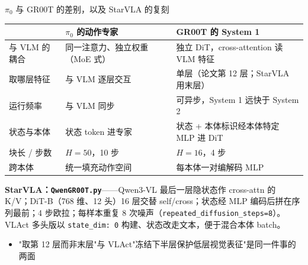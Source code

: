 \documentclass[aspectratio=169,10pt]{beamer}
\begin{document}
\begin{frame}{$\pi_0$ 与 GR00T 的差别，以及 StarVLA 的复刻}
  \begin{center}\small
  \begin{tabular}{p{2.6cm}p{4.6cm}p{5.4cm}}
    \toprule
     & $\pi_0$ 的动作专家 & GR00T 的 System 1 \\
    \midrule
    与 VLM 的耦合 & 同一注意力、独立权重（MoE 式） & 独立 DiT，cross-attention 读 VLM 特征 \\
    取哪层特征 & 与 VLM 逐层交互 & 单层（论文第 12 层；StarVLA 用末层） \\
    运行频率 & 与 VLM 同步 & 可异步，System 1 远快于 System 2 \\
    状态与本体 & 状态 token 进专家 & 状态 + 本体标识经本体特定 MLP 进 DiT \\
    块长 / 步数 & $H=50$，10 步 & $H=16$，4 步 \\
    跨本体 & 统一填充动作空间 & 每本体一对编解码 MLP \\
    \bottomrule
  \end{tabular}
  \end{center}
  \vspace{4pt}
  \textbf{StarVLA：\texttt{QwenGR00T.py}}——Qwen3-VL 最后一层隐状态作 cross-attn 的 K/V；DiT-B（768 维、12 头）16 层交替 self/cross；状态经 MLP 编码后拼在序列最前；4 步欧拉；每样本重复 8 次噪声（\texttt{repeated\_diffusion\_steps=8}）。VLAct 多头版以 \texttt{state\_dim: 0} 构建、状态改走文本，便于混合本体 batch。
  \vspace{4pt}
  \begin{itemize}
    \item "取第 12 层而非末层"与 VLAct"冻结下半层保护低层视觉表征"是同一件事的两面
  \end{itemize}
\end{frame}

\end{document}
